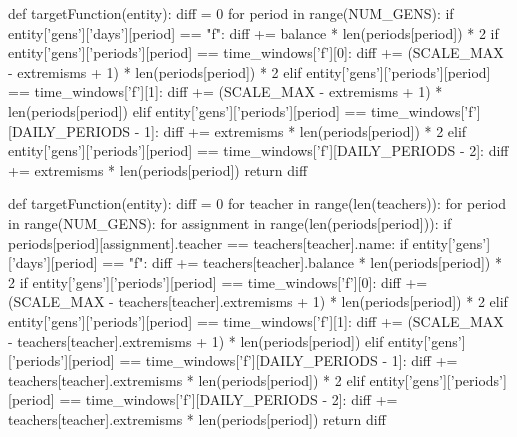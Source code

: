 \documentclass[a4paper,12pt]{article}
\begin{document}
\begin{python}
def targetFunction(entity):
    diff = 0
    for period in range(NUM_GENS):
        if entity['gens']['days'][period] == "f":
            diff += balance * len(periods[period]) * 2
        if entity['gens']['periods'][period] == time_windows['f'][0]:
            diff += (SCALE_MAX - extremisms + 1) * len(periods[period]) * 2
        elif entity['gens']['periods'][period] == time_windows['f'][1]:
            diff += (SCALE_MAX - extremisms + 1) * len(periods[period])
        elif entity['gens']['periods'][period] == time_windows['f'][DAILY_PERIODS - 1]:
            diff += extremisms * len(periods[period]) * 2
        elif entity['gens']['periods'][period] == time_windows['f'][DAILY_PERIODS - 2]:
            diff += extremisms * len(periods[period])
    return diff


def targetFunction(entity):
    diff = 0
    for teacher in range(len(teachers)):
        for period in range(NUM_GENS):
            for assignment in range(len(periods[period])):
                if periods[period][assignment].teacher == teachers[teacher].name:
                    if entity['gens']['days'][period] == "f":
                        diff += teachers[teacher].balance * len(periods[period]) * 2
                    if entity['gens']['periods'][period] == time_windows['f'][0]:
                        diff += (SCALE_MAX - teachers[teacher].extremisms + 1) * len(periods[period]) * 2
                    elif entity['gens']['periods'][period] == time_windows['f'][1]:
                        diff += (SCALE_MAX - teachers[teacher].extremisms + 1) * len(periods[period])
                    elif entity['gens']['periods'][period] == time_windows['f'][DAILY_PERIODS - 1]:
                        diff += teachers[teacher].extremisms * len(periods[period]) * 2
                    elif entity['gens']['periods'][period] == time_windows['f'][DAILY_PERIODS - 2]:
                        diff += teachers[teacher].extremisms * len(periods[period])
    return diff



\end{python}
\end{document}
